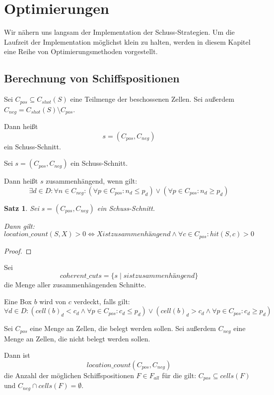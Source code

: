 \documentclass[a4paper,12pt]{llncs}
\numberwithin{equation}{section}
\newtheorem{satz}{Satz}
\begin{document}
\section{Optimierungen}

Wir nähern uns langsam der Implementation der Schuss-Strategien.
Um die Laufzeit der Implementation möglichst klein zu halten, werden in diesem Kapitel eine Reihe von Optimierungsmethoden vorgestellt.

\subsection{Berechnung von Schiffspositionen}
\begin{definition}
Sei $C_{pos} \subseteq C_{shot}(S)$ eine Teilmenge der beschossenen Zellen.
Sei außerdem $C_{neg}=C_{shot}(S) \setminus C_{pos}$.

Dann heißt
\[
s=(C_{pos}, C_{neg})
\]
ein Schuss-Schnitt.
\end{definition}

\begin{definition}
Sei $s=(C_{pos}, C_{neg})$ ein Schuss-Schnitt.

Dann heißt $s$ zusammenhängend, wenn gilt:
\[
\exists d \in D \colon \forall n \in C_{neg} \colon (\forall p \in C_{pos} \colon n_d \leq p_d) \lor (\forall p \in C_{pos} \colon n_d \geq p_d)
\]
\end{definition}

\begin{satz}
Sei $s=(C_{pos}, C_{neg})$ ein Schuss-Schnitt.

Dann gilt:
\[
location\_count(S, X) > 0 \Leftrightarrow X ist zusammenhängend \land \forall c \in C_{pos} \colon hit(S,c) > 0
\]
\end{satz}

\begin{proof}
\end{proof}

\begin{definition}
Sei
\[
coherent\_cuts=\{s \mid s ist zusammenhängend\}
\]
die Menge aller zusammenhängenden Schnitte.
\end{definition}

\begin{definition}
Eine Box $b$ wird von $c$ verdeckt, falls gilt:
\[
\forall d \in D \colon (cell(b)_d < c_d \land \forall p \in C_{pos} \colon c_d \leq p_d) \lor (cell(b)_d > c_d \land \forall p \in C_{pos} \colon c_d \geq p_d)
\]

Sei $C_{pos}$ eine Menge an Zellen, die belegt werden sollen. Sei außerdem $C_{neg}$ eine Menge an Zellen, die nicht belegt werden sollen.

Dann ist
\[
location\_count(C_{pos}, C_{neg})
\]
die Anzahl der möglichen Schiffspositionen $F \in F_{all}$ für die gilt: $C_{pos} \subseteq cells(F)$ und $C_{neg} \cap cells(F) = \emptyset$.
\end{definition}
\end{document}
